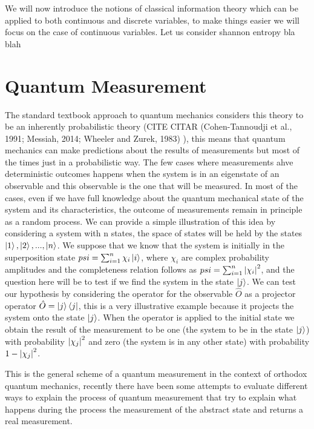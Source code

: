 We will now introduce the notions of classical information theory which can be applied to both continuous and discrete variables, to make things easier we will focus on the case of continuous variables.
Let us consider shannon entropy bla blah






\section{Quantum Measurement}
The standard textbook approach to quantum mechanics considers this theory to be an inherently probabilistic theory (CITE CITAR (Cohen-Tannoudji et al., 1991; Messiah, 2014; Wheeler and Zurek, 1983) ), this means that quantum mechanics can make predictions about the results of measurements but most of the times just in a probabilistic way. The few cases where measurements ahve deterministic outcomes happens when the system is in an eigenstate of an observable and this observable is the one that will be measured. In most of the cases, even if we have full knowledge about the quantum mechanical state of the system and its characteristics, the outcome of measurements remain in principle as a random process. We can provide a simple illustration of this idea by considering a system with n states, the space of states will be held by the states $\ket{1},\ket{2},...,\ket{n}$. We suppose that we know that the system is initially in the superposition state $psi=\sum_{i=1}^n \chi_i\ket{i}$, where $\chi_i$ are complex probability amplitudes and the completeness relation follows as $psi=\sum_{i=1}^n \abs{\chi_i}^2$, and the question here will be to test if we find the system in the state $\ket{j}$. We can test our hypothesis by considering the operator for the observable $\hat{O}$ as a projector operator $\hat{O}=\ket{j}\bra{j}$, this is a very illustrative example because it projects the system onto the state $\ket{j}$. When the operator is applied to the initial state we obtain the result of the measurement to be one (the system to be in the state $\ket{j}$) with probability $\abs{\chi_j}^2$ and zero (the system is in any other state) with probability $1-\abs{\chi_j}^2$.\par 
This is the general scheme of a quantum measurement in the context of orthodox quantum mechanics, recently there have been some attempts to evaluate different ways to explain the process of quantum measurement that try to explain what happens  during  the process the measurement of the abstract state and returns a real measurement.


